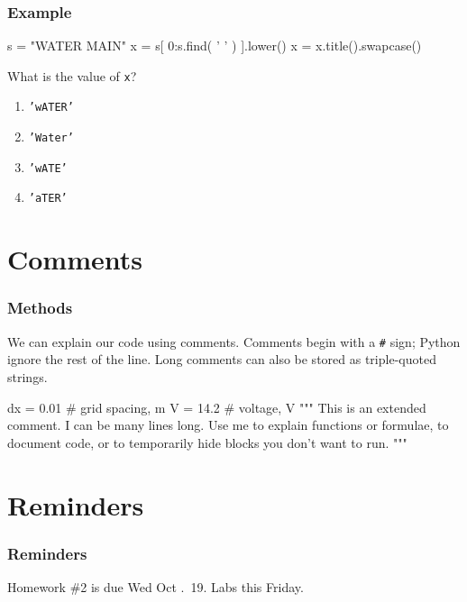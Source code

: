 \documentclass[11pt]{beamer}
\begin{document}
\begin{frame}[fragile]
  \frametitle{Example}
  \Enlarge

  \begin{semiverbatim}
s = "WATER MAIN"
x = s[ 0:s.find( ' ' ) ].lower()
x = x.title().swapcase()
  \end{semiverbatim}
  What is the value of \texttt{x}?
  \begin{enumerate}[label=\Alph*]
  \item  \texttt{'wATER'}
  \item  \texttt{'Water'}
  \item  \texttt{'wATE'}
  \item  \texttt{'aTER'}
  \end{enumerate}
\end{frame}

\section{Comments}

\begin{frame}[fragile]
  \frametitle{Methods}
  \Enlarge

  \begin{itemize}
  \myitem  We can explain our code using comments. \pause
  \myitem  Comments begin with a \texttt{\#} sign; Python ignore the rest of the line. \pause
  \myitem  Long comments can also be stored as triple-quoted strings. \pause
    \begin{semiverbatim}
dx = 0.01  # grid spacing, m
V  = 14.2  # voltage, V
"""
This is an extended comment.
I can be many lines long.
Use me to explain functions or formulae, to document code,
or to temporarily hide blocks you don't want to run.
"""
    \end{semiverbatim}
  \end{itemize}
\end{frame}

\section{Reminders}

\begin{frame}
  \frametitle{Reminders}
  \Enlarge

  \begin{itemize}
  \myitem  Homework \#2 is due Wed Oct .\ 19.
  \myitem  Labs this Friday.
  \end{itemize}
\end{frame}
\end{document}
